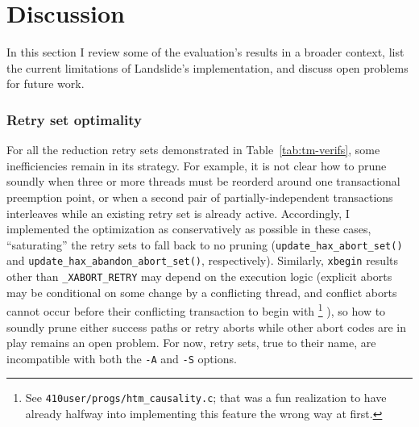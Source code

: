 


\section{Discussion}

In this section I review some of the evaluation's results in a broader context,
list the current limitations of Landslide's implementation,
and discuss open problems for future work.

\subsubsection{Retry set optimality}

For all the reduction retry sets demonstrated in Table~\ref{tab:tm-verifs},
some inefficiencies remain in its strategy.
For example, it is not clear how to prune soundly
when three or more threads must be reorderd around one transactional preemption point,
or when a second pair of partially-independent transactions interleaves while an existing retry set is already active.
Accordingly, I implemented the optimization as conservatively as possible in these cases,
``saturating'' the retry sets to fall back to no pruning
({\tt update\_hax\_abort\_set()} and
{\tt update\_hax\_abandon\_abort\_set()}, respectively).
Similarly, {\tt xbegin} results other than {\tt \_XABORT\_RETRY}
may depend on the execution logic
(explicit aborts may be conditional on some change by a conflicting thread,
and conflict aborts cannot occur before their conflicting transaction to begin with%
\footnote{See {\tt 410user/progs/htm\_causality.c}; that was a fun realization to have
already halfway into implementing this feature the wrong way at first.}%
),
so how to soundly prune either success paths or retry aborts
while other abort codes are in play
remains an open problem.
For now, retry sets, true to their name,
are incompatible with both the {\tt -A} and {\tt -S} options.

